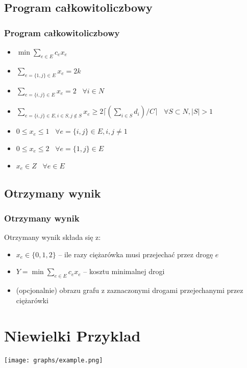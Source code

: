 \documentclass{beamer}
\begin{document}
\subsection{Program całkowitoliczbowy}
\begin{frame}
\frametitle{Program całkowitoliczbowy}
\begin{itemize}
    \item[] $\displaystyle \min \sum_{e \in E} c_e x_e$
    \item[] $\displaystyle \sum_{e=\{1,j\} \in E} x_e = 2k$
    \item[] $\displaystyle \sum_{e=\{i,j\} \in E} x_e = 2 \;\;\; \forall i \in N$
    \item[] $\displaystyle \sum_{e=\{i,j\} \in E, i \in S, j \not\in S} x_e \geq 2\lceil (\sum_{i\in S} d_i)/C \rceil \;\;\; \forall S \subset N, |S| > 1$
    \item[] $\displaystyle 0 \leq x_e \leq 1 \;\;\; \forall e = \{i,j\} \in E, i,j \neq 1$
    \item[] $\displaystyle 0 \leq x_e \leq 2 \;\;\; \forall e = \{1,j\} \in E$
    \item[] $\displaystyle x_e \in Z \;\;\; \forall e \in E$
\end{itemize}
\end{frame}

\subsection{Otrzymany wynik}
\begin{frame}
\frametitle{Otrzymany wynik}
Otrzymany wynik składa się z:
\begin{itemize}
    \item $x_e \in \{0,1,2\}$ -- ile razy ciężarówka musi przejechać przez drogę $e$
    \item $Y = \min \sum_{e \in E} c_e x_e$ -- kosztu minimalnej drogi
    \item (opcjonalnie) obrazu grafu z zaznaczonymi drogami przejechanymi przez ciężarówki
\end{itemize}
\end{frame}

\section{Niewielki Przyklad}
\begin{frame}
\texttt{[image: graphs/example.png]}
\end{frame}
\end{document}
